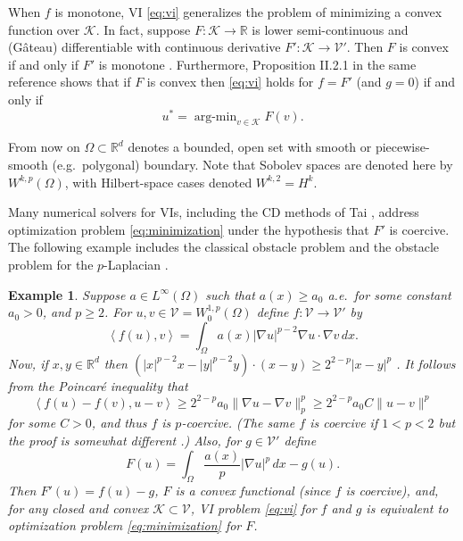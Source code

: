 \documentclass[letterpaper,final,12pt,reqno]{amsart}
\theoremstyle{cstyle}
\theoremstyle{cstyle*}
\theoremstyle{dstyle}
\newtheorem{example}[theorem]{Example}
\numberwithin{equation}{section}
\numberwithin{figure}{section}
\numberwithin{table}{section}
\numberwithin{theorem}{section}
\newcommand{\RR}{\mathbb{R}}
\newcommand{\grad}{\nabla}
\newcommand{\cK}{\mathcal{K}}
\newcommand{\cV}{\mathcal{V}}
\newcommand{\ip}[2]{\left<#1,#2\right>}
\begin{document}
When $f$ is monotone, VI \eqref{eq:vi} generalizes the problem of minimizing a convex function over $\cK$.  In fact, suppose $F:\cK \to \RR$ is lower semi-continuous and (G\^ateau) differentiable with continuous derivative $F':\cK \to \cV'$.  Then $F$ is convex if and only if $F'$ is monotone \cite[Proposition I.5.5]{EkelandTemam1976}.  Furthermore, Proposition II.2.1 in the same reference shows that if $F$ is convex then \eqref{eq:vi} holds for $f=F'$ (and $g=0$) if and only if
\begin{equation}
u^* = \operatorname{arg-min}_{v\in\cK} F(v). \label{eq:minimization}
\end{equation}

From now on $\Omega \subset \RR^d$ denotes a bounded, open set with smooth or piecewise-smooth (e.g.~polygonal) boundary.  Note that Sobolev spaces \cite{Evans2010} are denoted here by $W^{k,p}(\Omega)$, with Hilbert-space cases denoted $W^{k,2}=H^k$.

Many numerical solvers for VIs, including the CD methods of Tai \cite{Tai2003}, address optimization problem \eqref{eq:minimization} under the hypothesis that $F'$ is coercive.  The following example includes the classical obstacle problem \cite{GraeserKornhuber2009} and the obstacle problem for the $p$-Laplacian \cite{ChoeLewis1991}.

\begin{example}  \label{ex:plaplacian}  Suppose $a\in L^\infty(\Omega)$ such that $a(x)\ge a_0$ a.e.~for some constant $a_0>0$, and $p\ge 2$.  For $u,v \in \cV = W^{1,p}_0(\Omega)$ define $f:\cV \to \cV'$ by
\begin{equation}
\ip{f(u)}{v} = \int_\Omega a(x) |\grad u|^{p-2} \grad u \cdot \grad v\,dx. \label{eq:plaplacian}
\end{equation}
Now, if $x,y\in\RR^d$ then $(|x|^{p-2} x - |y|^{p-2} y)\cdot (x-y) \ge 2^{2-p} |x-y|^p$ \cite[see Appendix A and references therein]{Bueler2021conservation}.  It follows from the Poincar\'e inequality that
    $$\ip{f(u) - f(v)}{u-v} \ge 2^{2-p} a_0 \|\grad u - \grad v\|_p^p \ge 2^{2-p} a_0 C \|u-v\|^p$$
for some $C>0$, and thus $f$ is $p$-coercive.  (The same $f$ is coercive if $1<p<2$ but the proof is somewhat different \cite[Theorem 4.4]{Bueler2021conservation}.)  Also, for $g\in\cV'$ define
    $$F(u) = \int_\Omega \frac{a(x)}{p} |\grad u|^p\,dx - g(u).$$
Then $F'(u) = f(u) - g$, $F$ is a convex functional (since $f$ is coercive), and, for any closed and convex $\cK\subset \cV$, VI problem \eqref{eq:vi} for $f$ and $g$ is equivalent to optimization problem \eqref{eq:minimization} for $F$.
\end{example}
\end{document}
